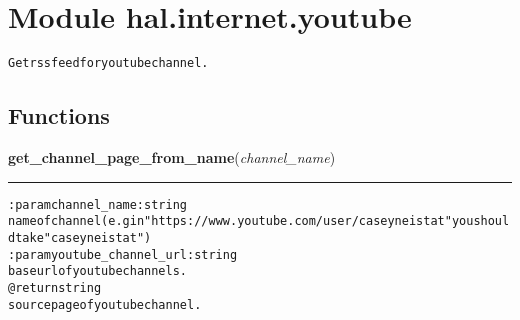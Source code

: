 %
%
%


\section{Module hal.internet.youtube}

    \label{hal:internet:youtube}
\begin{alltt}
Get rss feed for youtube channel. 
\end{alltt}



  \subsection{Functions}

    \label{hal:internet:youtube:get_channel_page_from_name}

    \vspace{0.5ex}

\hspace{.8\funcindent}\begin{boxedminipage}{\funcwidth}

    \raggedright \textbf{get\_channel\_page\_from\_name}(\textit{channel\_name})

    \vspace{-1.5ex}

    \rule{\textwidth}{0.5\fboxrule}
\setlength{\parskip}{2ex}
\begin{alltt}

:param channel\_name: string
    name of channel (e.g in "https://www.youtube.com/user/caseyneistat" you should take "caseyneistat")
:param youtube\_channel\_url: string
    base url of youtube channels.
@return string
    source page of youtube channel.
\end{alltt}

\setlength{\parskip}{1ex}
    \end{boxedminipage}

